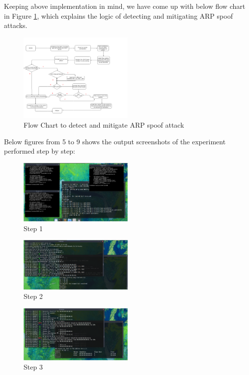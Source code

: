 \documentclass[conference]{IEEEtran}
\begin{document}
Keeping above implementation in mind, we have come up with below flow chart in Figure \ref{fig:flowchart}, which explains the logic of detecting and mitigating ARP spoof attacks.

\begin{figure}[h!]
\includegraphics[width=0.5\textwidth]{figure3.png}
\caption{Flow Chart to detect and mitigate ARP spoof attack}
\label{fig:flowchart}
\end{figure}

Below figures from 5 to 9 shows the output screenshots of the experiment performed step by step:

\begin{figure}[h!]
\includegraphics[width=0.5\textwidth]{out1.png}
\caption{Step 1}
\end{figure}

\begin{figure}[h!]
\includegraphics[width=0.5\textwidth]{out2.png}
\caption{Step 2}
\end{figure}

\begin{figure}[h!]
\includegraphics[width=0.5\textwidth]{out3.png}
\caption{Step 3}
\end{figure}
\end{document}
